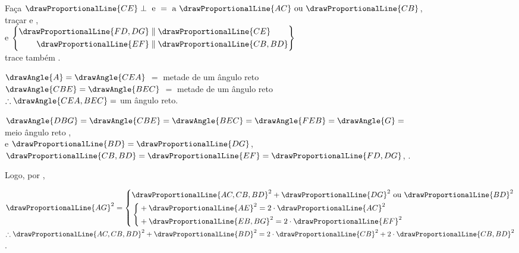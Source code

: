 \documentclass[booklanguage=brazilian]{byrnebook}
\begin{document}
\begin{center}
Faça $\drawProportionalLine{CE} \perp \mbox{ e } = \mbox{ a } \drawProportionalLine{AC} \mbox{ ou } \drawProportionalLine{CB}$,\\
traçar  e ,\\
e $\left\{
\begin{aligned}
\drawProportionalLine{FD,DG} & \parallel \drawProportionalLine{CE} \\
\drawProportionalLine{EF} & \parallel \drawProportionalLine{CB,BD}\\
\end{aligned}
\right\}$ \\
trace também .

$\drawAngle{A} = \drawAngle{CEA}$  $=$ metade de um ângulo reto \\
$\drawAngle{CBE} = \drawAngle{BEC}$  $=$ metade de um ângulo reto \\
$\therefore \drawAngle{CEA,BEC} = $ um ângulo reto.

$\drawAngle{DBG} = \drawAngle{CBE} = \drawAngle{BEC} = \drawAngle{FEB} = \drawAngle{G} =$\\
meio ângulo reto ,\\%
e $\drawProportionalLine{BD} = \drawProportionalLine{DG}$, $\drawProportionalLine{CB,BD} = \drawProportionalLine{EF} = \drawProportionalLine{FD,DG}$, .

Logo, por ,

$\drawProportionalLine{AG}^2 = \left\{
\begin{aligned}
& \drawProportionalLine{AC,CB,BD}^2 + \drawProportionalLine{DG}^2 \mbox{ ou } \drawProportionalLine{BD}^2 \\
& \left\{
	\begin{aligned}
		& + \drawProportionalLine{AE}^2 = 2 \cdot \drawProportionalLine{AC}^2 \\
		& + \drawProportionalLine{EB,BG}^2 = 2\cdot \drawProportionalLine{EF}^2 \\
	\end{aligned}
	\right. \\
\end{aligned}
\right.$\\
$\therefore \drawProportionalLine{AC,CB,BD}^2 + \drawProportionalLine{BD}^2 = 2 \cdot \drawProportionalLine{CB}^2 + 2 \cdot \drawProportionalLine{CB,BD}^2$.
\end{center}
\end{document}
